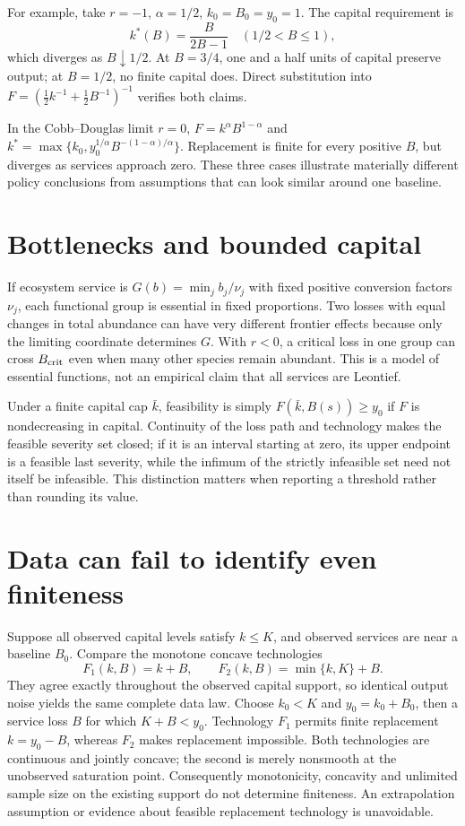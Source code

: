\documentclass[11pt]{article}
\begin{document}
For example, take $r=-1$, $\alpha=1/2$, $k_0=B_0=y_0=1$. The capital requirement is
\[
 k^*(B)=\frac{B}{2B-1}\quad(1/2<B\leq1),
\]
which diverges as $B\downarrow1/2$. At $B=3/4$, one and a half units of capital preserve output; at $B=1/2$, no finite capital does. Direct substitution into $F=(\tfrac12k^{-1}+\tfrac12B^{-1})^{-1}$ verifies both claims.

In the Cobb--Douglas limit $r=0$, $F=k^\alpha B^{1-\alpha}$ and $k^*=\max\{k_0,y_0^{1/\alpha}B^{-(1-\alpha)/\alpha}\}$. Replacement is finite for every positive $B$, but diverges as services approach zero. These three cases illustrate materially different policy conclusions from assumptions that can look similar around one baseline.

\section{Bottlenecks and bounded capital}
If ecosystem service is $G(b)=\min_j b_j/\nu_j$ with fixed positive conversion factors $\nu_j$, each functional group is essential in fixed proportions. Two losses with equal changes in total abundance can have very different frontier effects because only the limiting coordinate determines $G$. With $r<0$, a critical loss in one group can cross $B_{\rm crit}$ even when many other species remain abundant. This is a model of essential functions, not an empirical claim that all services are Leontief.

Under a finite capital cap $\bar k$, feasibility is simply $F(\bar k,B(s))\geq y_0$ if $F$ is nondecreasing in capital. Continuity of the loss path and technology makes the feasible severity set closed; if it is an interval starting at zero, its upper endpoint is a feasible last severity, while the infimum of the strictly infeasible set need not itself be infeasible. This distinction matters when reporting a threshold rather than rounding its value.

\section{Data can fail to identify even finiteness}
Suppose all observed capital levels satisfy $k\leq K$, and observed services are near a baseline $B_0$. Compare the monotone concave technologies
\[
 F_1(k,B)=k+B,\qquad F_2(k,B)=\min\{k,K\}+B.
\]
They agree exactly throughout the observed capital support, so identical output noise yields the same complete data law. Choose $k_0<K$ and $y_0=k_0+B_0$, then a service loss $B$ for which $K+B<y_0$. Technology $F_1$ permits finite replacement $k=y_0-B$, whereas $F_2$ makes replacement impossible. Both technologies are continuous and jointly concave; the second is merely nonsmooth at the unobserved saturation point. Consequently monotonicity, concavity and unlimited sample size on the existing support do not determine finiteness. An extrapolation assumption or evidence about feasible replacement technology is unavoidable.
\end{document}
